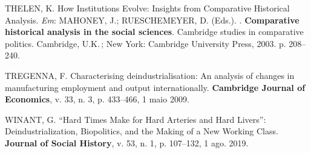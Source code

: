 THELEN, K. How Institutions Evolve: Insights from Comparative Historical
Analysis. \emph{Em}: MAHONEY, J.; RUESCHEMEYER, D. (Eds.). .
\textbf{Comparative historical analysis in the social sciences}.
Cambridge studies in comparative politics. Cambridge, U.K.\,; New York:
Cambridge University Press, 2003. p. 208--240.

TREGENNA, F. Characterising deindustrialisation: An analysis of changes
in manufacturing employment and output internationally.
\textbf{Cambridge Journal of Economics}, v. 33, n. 3, p. 433--466, 1
maio 2009.

WINANT, G. ``Hard Times Make for Hard Arteries and Hard Livers'':
Deindustrialization, Biopolitics, and the Making of a New Working Class.
\textbf{Journal of Social History}, v. 53, n. 1, p. 107--132, 1 ago.
2019.
